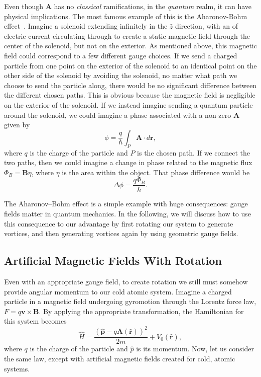 Even though $\mathbf{A}$ has no \textit{classical} ramifications, in the \textit{quantum} realm, it can have physical implications.
The most famous example of this is the Aharonov-Bohm effect~\cite{Aharonov1959}. 
Imagine a solenoid extending infinitely in the $\hat z$ direction, with an of electric current circulating through to create a static magnetic field through the center of the solenoid, but not on the exterior. 
As mentioned above, this magnetic field could correspond to a few different gauge choices.
If we send a charged particle from one point on the exterior of the solenoid to an identical point on the other side of the solenoid by avoiding the solenoid, no matter what path we choose to send the particle along, there would be no significant difference between the different chosen paths.
This is obvious because the magnetic field is negligible on the exterior of the solenoid.
If we instead imagine sending a quantum particle around the solenoid, we could imagine a phase associated with a non-zero $\mathbf{A}$ given by
\begin{equation}
\phi = \frac{q}{\hbar}\int_P \mathbf{A} \cdot d\mathbf{r},
\end{equation}
where $q$ is the charge of the particle and $P$ is the chosen path.
If we connect the two paths, then we could imagine a change in phase related to the magnetic flux $\Phi_B = \mathbf{B}\eta$, where $\eta$ is the area within the object. 
That phase difference would be
\begin{equation}
\Delta\phi = \frac{q\Phi_B}{\hbar}.
\end{equation}

The Aharonov--Bohm effect is a simple example with huge consequences: gauge fields matter in quantum mechanics. 
In the following, we will discuss how to use this consequence to our advantage by first rotating our system to generate vortices, and then generating vortices again by using geometric gauge fields.

\subsection{Artificial Magnetic Fields With Rotation}
\label{sec:rot}

Even with an appropriate gauge field, to create rotation we still must somehow provide angular momentum to our cold atomic system.
Imagine a charged particle in a magnetic field undergoing gyromotion through the Lorentz force law, $F=q\mathbf{v} \times \mathbf{B}$.
By applying the appropriate transformation, the Hamiltonian for this system becomes
\begin{equation}
\hat H = \frac{(\hat{\mathbf{p}} - q \mathbf{A}(\hat{\mathbf{r}}))^2}{2m} + V_0(\hat{\mathbf{r}}),
\label{eqn:lorentz}
\end{equation}
where $q$ is the charge of the particle and $\hat p$ is its momentum.
Now, let us consider the same law, except with artificial magnetic fields created for cold, atomic systems.

